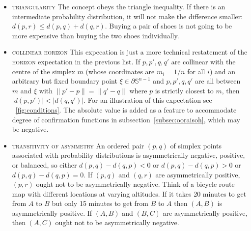 \documentclass[phd,12pt,oneside]{ubcthesis}
\begin{document}
\begin{itemize}
\item \textsc{triangularity} The concept obeys the triangle
  inequality. If there is an intermediate probability distribution, it
  will not make the difference smaller: $d(p,r)\leq{}d(p,q)+d(q,r)$.
  Buying a pair of shoes is not going to be more expensive than buying
  the two shoes individually.
\item \textsc{collinear horizon} This expecation is just a more
  technical restatement of the \textsc{horizon} expectation in the
  previous list. If $p,p',q,q'$ are collinear with the centre of the
  simplex $m$ (whose coordinates are $m_{i}=1/n$ for all $i$) and an
  arbitrary but fixed boundary point $\xi\in\partial\mathbb{S}^{n-1}$
  and $p,p',q,q'$ are all between $m$ and $\xi$ with
  $\|p'-p\|=\|q'-q\|$ where $p$ is strictly closest to $m$, then
  $|d(p,p')|<|d(q,q')|$. For an illustration of this expectation see
  {\igure}~\ref{fig:conditions}. The absolute value is added as a
  feature to accommodate degree of confirmation functions in
  subsection~\ref{subsec:ooraisoh}, which may be negative.
\item \textsc{transitivity of asymmetry} An ordered pair $(p,q)$ of
  simplex points associated with probability distributions is
  asymmetrically negative, positive, or balanced, so either
  $d(p,q)-d(q,p)<0$ or $d(p,q)-d(q,p)>0$ or $d(p,q)-d(q,p)=0$. If
  $(p,q)$ and $(q,r)$ are asymmetrically positive, $(p,r)$ ought not
  to be asymmetrically negative. Think of a bicycle route map with
  different locations at varying altitudes. If it takes 20 minutes to
  get from $A$ to $B$ but only 15 minutes to get from $B$ to $A$ then
  $(A,B)$ is asymmetrically positive. If $(A,B)$ and $(B,C)$ are
  asymmetrically positive, then $(A,C)$ ought not to be asymmetrically
  negative.
\end{itemize}
\end{document}
